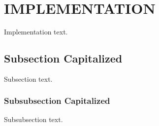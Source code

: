 \section{\uppercase{Implementation}}\label{sec:implementation}

\noindent Implementation text.


\subsection{Subsection Capitalized}\label{sec:subsecimplementation}

Subsection text.


\subsubsection{Subsubsection Capitalized}\label{sec:subsubsecimplementation}

Subsubsection text.
